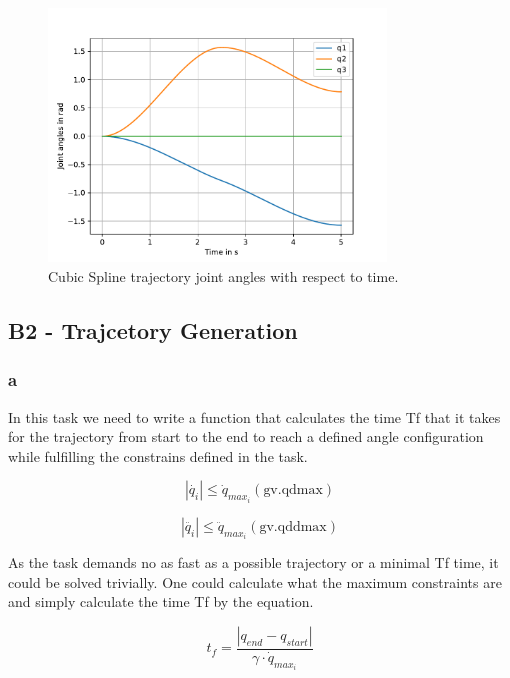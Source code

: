 \begin{figure} [H]
   \begin{center}
        \includegraphics[width=0.8\textwidth]{SRC/Cubic_Spline.pdf}
   \end{center}
  \caption{Cubic Spline trajectory joint angles with respect to time.}
  \label{fig:CubicSplinePlot}
\end{figure}

\subsection{B2 - Trajcetory Generation}
\subsubsection{a}

In this task we need to write a function that calculates the time Tf that it takes for the trajectory from start to the end to reach a defined angle configuration while fulfilling the constrains defined in the task. 

\begin{equation}
    |\dot{q_i}|\leq \dot{q}_{max_i}(\text{gv.qdmax})
\end{equation}

\begin{equation}
    |\ddot{q_i}|\leq \ddot{q}_{max_i}(\text{gv.qddmax})
\end{equation}

As the task demands no as fast as a possible trajectory or a minimal Tf time, it could be solved trivially. 
One could calculate what the maximum constraints are and simply calculate the time Tf by the equation. 

\begin{equation}
    t_f= \frac{|q_{end}-q_{start}|}{\gamma\cdot \dot{q}_{max_i}}
\end{equation}

